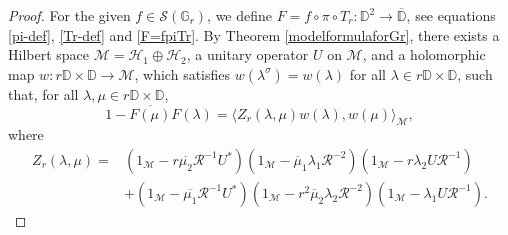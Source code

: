 \documentclass[12pt,reqno]{amsart}
\numberwithin{equation}{section}
\theoremstyle{definition}
\begin{document}
\begin{proof}
For the given $f\in\mathcal{S}(\mathbb{G}_{r})$, we define $F=f\circ \pi \circ T_{r} : \mathbb{D}^{2} \rightarrow \overline{\mathbb{D}}$, see equations \eqref{pi-def}, \eqref{Tr-def} and  \eqref{F=fpiTr}. By Theorem \ref{modelformulaforGr}, there exists a Hilbert space $\mathcal{M} = \mathcal{H}_{1}\oplus \mathcal{H}_{2}$, a unitary operator $U$ on $\mathcal{M}$, and  a holomorphic map $w: r\mathbb{D}\times \mathbb{D} \to \mathcal{M}$, which satisfies $w(\lambda^{\sigma}) = w(\lambda)$ for all $\lambda \in r\mathbb{D}\times\mathbb{D}$, such that, for all $\lambda, \mu \in r\mathbb{D}\times\mathbb{D}$,
\begin{equation}\label{rearrangedbidiscformula}
1-\overline{F(\mu)}F(\lambda) = \langle Z_{r}(\lambda, \mu) w(\lambda),w(\mu)\rangle_{\mathcal{M}},
\end{equation}
where
\begin{align}
Z_{r}(\lambda,\mu) = &(1_{\mathcal{M}}-r\overline{\mu_{2}}\mathcal{R}^{-1}U^{*})(1_{\mathcal{M}}-\overline{\mu}_{1}\lambda_{1}\mathcal{R}^{-2})(1_{\mathcal{M}}-r\lambda_{2}U\mathcal{R}^{-1})\nonumber\\
&+ (1_{\mathcal{M}}-\overline{\mu_{1}}\mathcal{R}^{-1}U^{*})(1_{\mathcal{M}}-r^{2} \overline{\mu}_{2}\lambda_{2}\mathcal{R}^{-2})(1_{\mathcal{M}}-\lambda_{1}U\mathcal{R}^{-1}).\label{Zroperator}
\end{align}


\end{proof}
\end{document}
